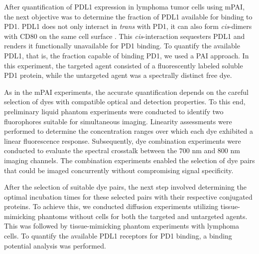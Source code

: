 After quantification of PDL1 expression in lymphoma tumor cells using mPAI, the next objective was to determine the fraction of PDL1 available for binding to PD1. PDL1 does not only interact in \textit{trans} with PD1, it can also form \textit{cis}-dimers with CD80 on the same cell surface \cite{sugiura2019restriction}. This \textit{cis}-interaction sequesters PDL1 and renders it functionally
unavailable for PD1 binding. To quantify the available PDL1, that is, the fraction capable of binding PD1, we used a PAI approach. In this experiment, the targeted agent consisted of a fluorescently labeled soluble PD1 protein, while the untargeted agent was a spectrally distinct free dye. 

As in the mPAI experiments, the accurate quantification depends on the careful selection of dyes with compatible optical and detection properties. To this end, preliminary liquid phantom experiments were conducted to identify two fluorophores suitable for simultaneous imaging. Linearity 
assessments were performed to determine the concentration ranges over which each dye exhibited a linear fluorescence response. Subsequently, dye combination experiments were conducted to evaluate the spectral crosstalk between the $700$ nm and $800$ nm imaging channels. The combination
experiments enabled the selection of dye pairs that could be imaged concurrently without compromising signal specificity. 

After the selection of suitable dye pairs, the next step involved determining the optimal incubation times for these selected pairs with their respective conjugated proteins. To achieve this, we conducted diffusion experiments utilizing tissue-mimicking phantoms without cells for both
the targeted and untargeted agents. This was followed by tissue-mimicking phantom experiments with lymphoma cells. To quantify the available PDL1 receptors for PD1 binding, a binding potential analysis was performed. 